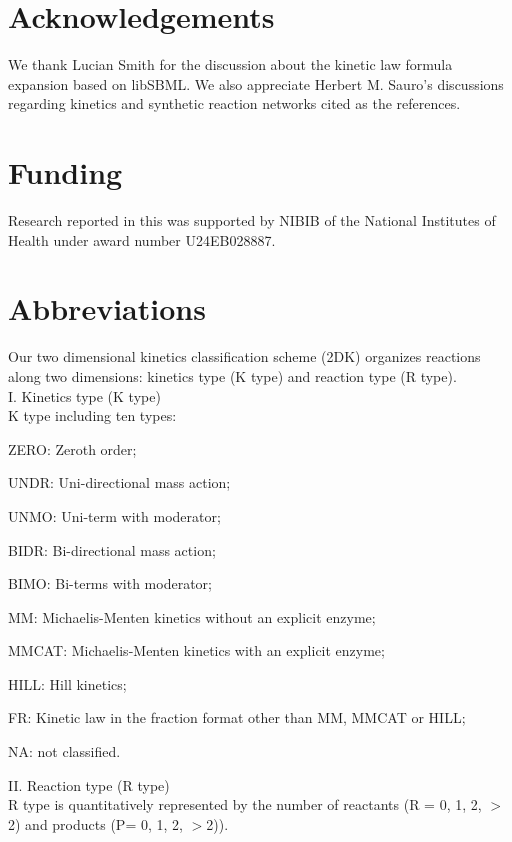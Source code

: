 \documentclass{bmcart}
\begin{document}


\begin{backmatter}

\section*{Acknowledgements}%
We thank Lucian Smith for the discussion about the kinetic law formula expansion based on libSBML. We also appreciate Herbert M. Sauro’s discussions regarding kinetics and synthetic reaction networks cited as the references.

\section*{Funding}%
Research reported in this was supported by NIBIB of the National Institutes of Health under award number U24EB028887.

\section*{Abbreviations}%
Our two dimensional kinetics classification scheme (2DK) organizes reactions along two dimensions: kinetics type (K type) and reaction type (R type).\\
I. Kinetics type (K type)\\
K type including ten types:
\begin{description}[font=$\bullet$~\normalfont\scshape\color{red!50!black}]
\item ZERO: Zeroth order;
\item UNDR: Uni-directional mass action;
\item UNMO: Uni-term with moderator;
\item BIDR: Bi-directional mass action;
\item BIMO: Bi-terms with moderator;
\item MM: Michaelis-Menten kinetics without an explicit enzyme;
\item MMCAT: Michaelis-Menten kinetics with an explicit enzyme;
\item HILL: Hill kinetics;
\item FR: Kinetic law in the fraction format other than MM, MMCAT or HILL;
\item NA: not classified.
\end{description}
II. Reaction type (R type)\\
R type is quantitatively represented by the number of reactants (R = 0, 1, 2, $>$2) and products (P= 0, 1, 2, $>$2)).


\end{backmatter}
\end{document}
